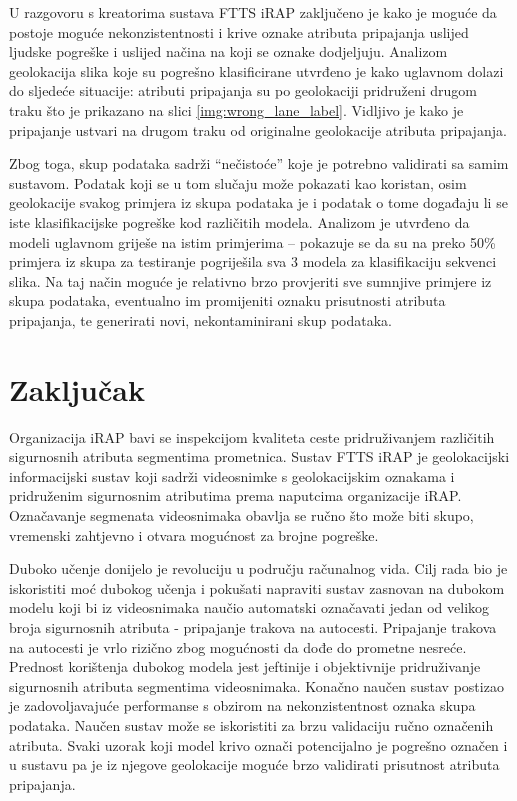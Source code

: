 \documentclass[times, utf8, diplomski, numeric]{fer}
\begin{document}
U razgovoru s kreatorima sustava FTTS iRAP zaključeno je kako je moguće da postoje moguće nekonzistentnosti i krive oznake atributa pripajanja uslijed ljudske pogreške i uslijed načina na koji se oznake dodjeljuju.
Analizom geolokacija slika koje su pogrešno klasificirane utvrđeno je kako uglavnom dolazi do sljedeće situacije: atributi pripajanja su po geolokaciji pridruženi drugom traku što je prikazano na slici \ref{img:wrong_lane_label}.
Vidljivo je kako je pripajanje ustvari na drugom traku od originalne geolokacije atributa pripajanja. 

Zbog toga, skup podataka sadrži ``nečistoće'' koje je potrebno validirati sa samim sustavom. 
Podatak koji se u tom slučaju može pokazati kao koristan, osim geolokacije svakog primjera iz skupa podataka je i podatak o tome događaju li se iste klasifikacijske pogreške kod različitih modela.
Analizom je utvrđeno da modeli uglavnom griješe na istim primjerima -- pokazuje se da su na preko 50\% primjera iz skupa za testiranje pogriješila sva 3 modela za klasifikaciju sekvenci slika.
Na taj način moguće je relativno brzo provjeriti sve sumnjive primjere iz skupa podataka, eventualno im promijeniti oznaku prisutnosti atributa pripajanja, te generirati novi, nekontaminirani skup podataka.

\chapter{Zaključak}
Organizacija iRAP bavi se inspekcijom kvaliteta ceste pridruživanjem različitih sigurnosnih atributa segmentima prometnica. 
Sustav FTTS iRAP je geolokacijski informacijski sustav koji sadrži videosnimke s geolokacijskim oznakama i pridruženim sigurnosnim atributima prema naputcima organizacije iRAP. 
Označavanje segmenata videosnimaka obavlja se ručno što može biti skupo, vremenski zahtjevno i otvara mogućnost za brojne pogreške. 

Duboko učenje donijelo je revoluciju u području računalnog vida. 
Cilj rada bio je iskoristiti moć dubokog učenja i pokušati napraviti sustav zasnovan na dubokom modelu koji bi iz videosnimaka naučio automatski označavati jedan od velikog broja sigurnosnih atributa - pripajanje trakova na autocesti.
Pripajanje trakova na autocesti je vrlo rizično zbog mogućnosti da dođe do prometne nesreće.
Prednost korištenja dubokog modela jest jeftinije i objektivnije pridruživanje sigurnosnih atributa segmentima videosnimaka. 
Konačno naučen sustav postizao je zadovoljavajuće performanse s obzirom na nekonzistentnost oznaka skupa podataka. 
Naučen sustav može se iskoristiti za brzu validaciju ručno označenih atributa. 
Svaki uzorak koji model krivo označi potencijalno je pogrešno označen i u sustavu pa je iz njegove geolokacije moguće brzo validirati prisutnost atributa pripajanja.
\end{document}
